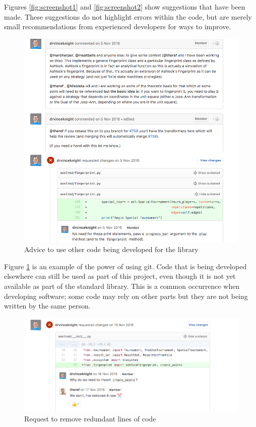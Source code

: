 Figures \ref{fig:screenshot1} and \ref{fig:screenshot2} show suggestions that have been made.
These suggestions do not highlight errors within the code, but are merely small recommendations from experienced developers for ways to improve.

\begin{figure}[htbp!]
\includegraphics[width = \textwidth]{../img/screenshots/ScreenShot2.png}
\caption{Advice to use other code being developed for the library}
\label{fig:screenshot3}
\end{figure}

Figure \ref{fig:screenshot3} is an example of the power of using git.
Code that is being developed elsewhere can still be used as part of this project, even though it is not yet available as part of the standard library.
This is a common occurrence when developing software; some code may rely on other parts but they are not being written by the same person.

\begin{figure}[htbp!]
\includegraphics[width = \textwidth]{../img/screenshots/ScreenShot3.png}
\caption{Request to remove redundant lines of code}
\label{fig:screenshot4}
\end{figure}


